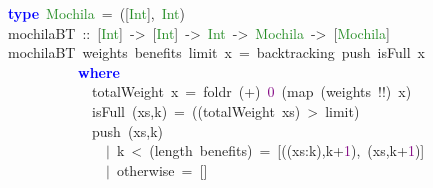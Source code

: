 \mbox{}\textbf{\textcolor{Blue}{type}}\ \textcolor{ForestGreen}{Mochila}\ \textcolor{BrickRed}{=}\ \textcolor{BrickRed}{([}\textcolor{ForestGreen}{Int}\textcolor{BrickRed}{],}\ \textcolor{ForestGreen}{Int}\textcolor{BrickRed}{)} \\
\mbox{}mochilaBT\ \textcolor{BrickRed}{::}\ \textcolor{BrickRed}{[}\textcolor{ForestGreen}{Int}\textcolor{BrickRed}{]}\ \textcolor{BrickRed}{-\textgreater{}}\ \textcolor{BrickRed}{[}\textcolor{ForestGreen}{Int}\textcolor{BrickRed}{]}\ \textcolor{BrickRed}{-\textgreater{}}\ \textcolor{ForestGreen}{Int}\ \textcolor{BrickRed}{-\textgreater{}}\ \textcolor{ForestGreen}{Mochila}\ \textcolor{BrickRed}{-\textgreater{}}\ \textcolor{BrickRed}{[}\textcolor{ForestGreen}{Mochila}\textcolor{BrickRed}{]} \\
\mbox{}mochilaBT\ weights\ benefits\ limit\ x\ \textcolor{BrickRed}{=}\ backtracking\ push\ isFull\ x \\
\mbox{}\ \ \ \ \ \ \ \ \ \ \textbf{\textcolor{Blue}{where}} \\
\mbox{}\ \ \ \ \ \ \ \ \ \ \ \ totalWeight\ x\ \textcolor{BrickRed}{=}\ foldr\ \textcolor{BrickRed}{(+)}\ \textcolor{Purple}{0}\ \textcolor{BrickRed}{(}map\ \textcolor{BrickRed}{(}weights\ \textcolor{BrickRed}{!!)}\ x\textcolor{BrickRed}{)} \\
\mbox{}\ \ \ \ \ \ \ \ \ \ \ \ isFull\ \textcolor{BrickRed}{(}xs\textcolor{BrickRed}{,}k\textcolor{BrickRed}{)}\ \textcolor{BrickRed}{=}\ \textcolor{BrickRed}{((}totalWeight\ xs\textcolor{BrickRed}{)}\ \textcolor{BrickRed}{\textgreater{}}\ limit\textcolor{BrickRed}{)} \\
\mbox{}\ \ \ \ \ \ \ \ \ \ \ \ push\ \textcolor{BrickRed}{(}xs\textcolor{BrickRed}{,}k\textcolor{BrickRed}{)} \\
\mbox{}\ \ \ \ \ \ \ \ \ \ \ \ \ \ \textcolor{BrickRed}{$|$}\ k\ \textcolor{BrickRed}{\textless{}}\ \textcolor{BrickRed}{(}length\ benefits\textcolor{BrickRed}{)}\ \textcolor{BrickRed}{=}\ \textcolor{BrickRed}{[((}xs\textcolor{BrickRed}{:}k\textcolor{BrickRed}{),}k\textcolor{BrickRed}{+}\textcolor{Purple}{1}\textcolor{BrickRed}{),}\ \textcolor{BrickRed}{(}xs\textcolor{BrickRed}{,}k\textcolor{BrickRed}{+}\textcolor{Purple}{1}\textcolor{BrickRed}{)]} \\
\mbox{}\ \ \ \ \ \ \ \ \ \ \ \ \ \ \textcolor{BrickRed}{$|$}\ otherwise\ \textcolor{BrickRed}{=}\ \textcolor{BrickRed}{[]} \\
\mbox{}
